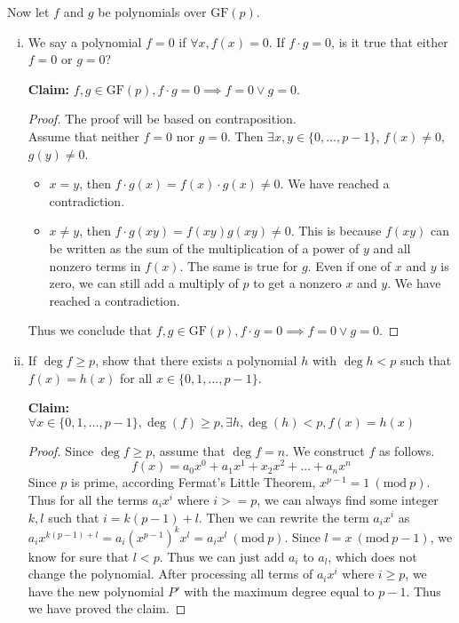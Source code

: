 \documentclass[11pt]{article}
\newcommand{\Mod}[1]{\ (\mathrm{mod}\ #1)}
\begin{document}
\begin{Parts}
	\Part Now let $f$ and $g$ be polynomials over $\mathrm{GF}(p)$.
    \begin{enumerate}[(i)]
        \item We say a polynomial $f = 0$ if $\forall x, f(x) = 0$.
              If $f\cdot g = 0$, is it true that either $f=0$ or $g=0$?
        \begin{Answer}
            \textbf{Claim:} $f,g \in \mathrm{GF}(p), f \cdot g = 0 \implies f = 0 \lor g = 0$. 
            \begin{proof}
                The proof will be based on contraposition. \\
                Assume that neither $f = 0$ nor $g = 0$. Then $\exists x,y \in \{0,\ldots,p-1\}$, $f(x) \neq 0$, $g(y) \neq 0$.
                \begin{itemize}
                    \item $x=y$, then $f \cdot g(x) = f(x) \cdot g(x) \neq 0$. We have reached a contradiction. 
                    \item $x \neq y$, then $f \cdot g(xy) = f(xy)g(xy) \neq 0$. This is because $f(xy)$ can be written as the 
                    sum of the multiplication of a power of $y$ and all nonzero terms in $f(x)$. The same is true for $g$. Even if
                    one of $x$ and $y$ is zero, we can still add a multiply of $p$ to get a nonzero $x$ and $y$. We have reached a contradiction.  
                \end{itemize}
                Thus we conclude that $f,g \in \mathrm{GF}(p), f \cdot g = 0 \implies f = 0 \lor g = 0$.
            \end{proof}
        \end{Answer}

        \item If $\deg{f} \geq p$, show that there exists a polynomial $h$ with 
              $\deg{h} < p$ such that $f(x) = h(x)$ for all $x \in \{0,1,...,p-1\}$.
        \begin{Answer}
            \textbf{Claim:} $\forall x \in \{0,1,\ldots,p-1\}, \deg(f) \geq p, \exists h, \deg(h) < p, f(x) = h(x)$
            \begin{proof}
                Since $\deg{f} \geq p$, assume that $\deg{f} = n$. We construct $f$ as follows. 
                $$f(x) = a_0x^0 + a_1x^1 + x_2x^2 + \ldots + a_nx^n$$
                Since $p$ is prime, according Fermat's Little Theorem, $x^{p-1} = 1 \Mod{p}$. Thus for all the terms $a_ix^i$ where $i >= p$, 
                we can always find some integer $k, l$ such that $i = k(p - 1) + l$. Then we can rewrite the term $a_ix^i$ as 
                $a_ix^{k(p - 1) + l} = a_i(x^{p-1})^kx^l = a_ix^l \Mod{p}$. Since $l = x \Mod{p - 1}$, we know for sure that $l < p$. Thus we can
                just add $a_i$ to $a_l$, which does not change the polynomial. After processing all terms of $a_ix^i$ where $i \geq p$, we have 
                the new polynomial $P'$ with the maximum degree equal to $p - 1$. Thus we have proved the claim. 
            \end{proof}
        \end{Answer}
        

\end{enumerate}
\end{Parts}
\end{document}
